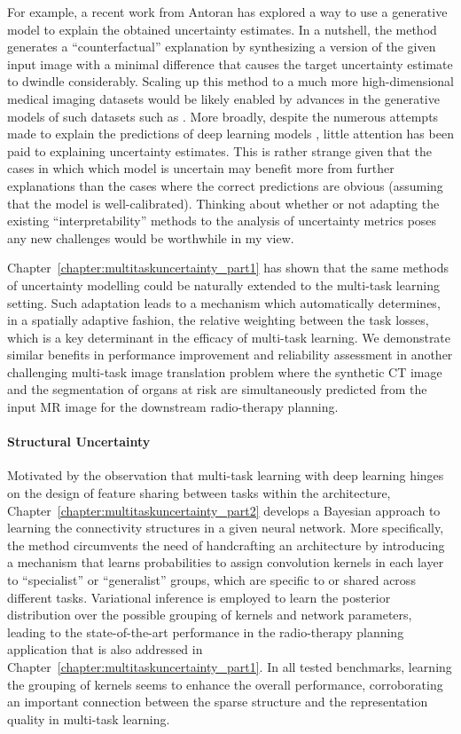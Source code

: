 For example, a recent work from Antoran \etal \cite{antoran2020getting} has explored a way to use a generative model to explain the obtained uncertainty estimates. In a nutshell, the method generates a ``counterfactual'' explanation by synthesizing a version of the given input image with a minimal difference that causes the target uncertainty estimate to dwindle considerably. Scaling up this method to a much more high-dimensional medical imaging datasets would be likely enabled by advances in the generative models of such datasets such as \cite{tudosiu2020neuromorphologicaly}. More broadly, despite the numerous attempts made to explain the predictions of deep learning models \cite{guidotti2018survey}, little attention has been paid to explaining uncertainty estimates. This is rather strange given that the cases in which which model is uncertain may benefit more from further explanations than the cases where the correct predictions are obvious (assuming that the model is well-calibrated). Thinking about whether or not adapting the existing ``interpretability'' methods to the analysis of uncertainty metrics poses any new challenges would be worthwhile in my view. 

Chapter~\ref{chapter:multitaskuncertainty_part1} has shown that the same methods of uncertainty modelling could be naturally extended to the multi-task learning setting. Such adaptation leads to a mechanism which automatically determines, in a spatially adaptive fashion, the relative weighting between the task losses, which is a key determinant in the efficacy of multi-task learning. We demonstrate similar benefits in performance improvement and reliability assessment in another challenging multi-task image translation problem where the synthetic CT image and the segmentation of organs at risk are simultaneously predicted from the input MR image for the downstream radio-therapy planning. 

\paragraph{Structural Uncertainty}
Motivated by the observation that multi-task learning with deep learning hinges on the design of feature sharing between tasks within the architecture, Chapter~\ref{chapter:multitaskuncertainty_part2} develops a Bayesian approach to learning the connectivity structures in a given neural network. More specifically, the method circumvents the need of handcrafting an architecture by introducing a mechanism that learns probabilities to assign convolution kernels in each layer to ``specialist'' or ``generalist'' groups, which are specific to or shared across different tasks. Variational inference is employed to learn the posterior distribution over the possible grouping of kernels and network parameters, leading to the state-of-the-art performance in the radio-therapy planning application that is also addressed in Chapter~\ref{chapter:multitaskuncertainty_part1}. In all tested benchmarks, learning the grouping of kernels seems to enhance the overall performance, corroborating an important connection between the sparse structure and the representation quality in multi-task learning. 

